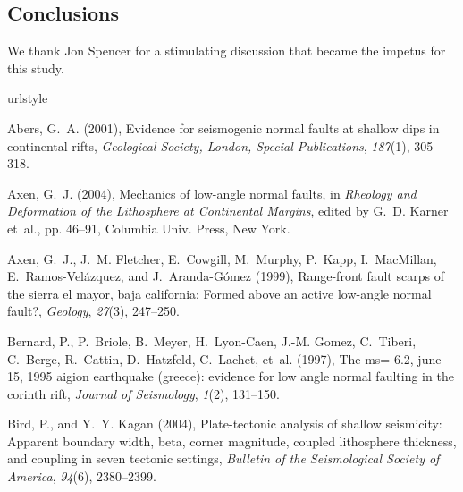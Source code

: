 \documentclass[twocolumn,grl]{AGUTeX}
\begin{document}
\begin{article}
\section{Conclusions}

\begin{acknowledgements}
  We thank Jon Spencer for a stimulating discussion that became the
  impetus for this study.
\end{acknowledgements}

\begin{thebibliography}{23}
\providecommand{\natexlab}[1]{#1}
\expandafter\ifx\csname urlstyle\endcsname\relax
  \providecommand{\doi}[1]{doi:\discretionary{}{}{}#1}\else
  \providecommand{\doi}{doi:\discretionary{}{}{}\begingroup
  \urlstyle{rm}\Url}\fi

Abers, G.~A. (2001), Evidence for seismogenic normal faults at shallow dips in
  continental rifts, \textit{Geological Society, London, Special Publications},
  \textit{187}(1), 305--318.

Axen, G.~J. (2004), Mechanics of low-angle normal faults, in \textit{Rheology
  and Deformation of the Lithosphere at Continental Margins}, edited by G.~D.
  Karner et~al., pp. 46--91, Columbia Univ. Press, New York.

Axen, G.~J., J.~M. Fletcher, E.~Cowgill, M.~Murphy, P.~Kapp, I.~MacMillan,
  E.~Ramos-Vel{\'a}zquez, and J.~Aranda-G{\'o}mez (1999), Range-front fault
  scarps of the sierra el mayor, baja california: Formed above an active
  low-angle normal fault?, \textit{Geology}, \textit{27}(3), 247--250.

Bernard, P., P.~Briole, B.~Meyer, H.~Lyon-Caen, J.-M. Gomez, C.~Tiberi,
  C.~Berge, R.~Cattin, D.~Hatzfeld, C.~Lachet, et~al. (1997), The ms= 6.2, june
  15, 1995 aigion earthquake (greece): evidence for low angle normal faulting
  in the corinth rift, \textit{Journal of Seismology}, \textit{1}(2), 131--150.

Bird, P., and Y.~Y. Kagan (2004), Plate-tectonic analysis of shallow
  seismicity: Apparent boundary width, beta, corner magnitude, coupled
  lithosphere thickness, and coupling in seven tectonic settings,
  \textit{Bulletin of the Seismological Society of America}, \textit{94}(6),
  2380--2399.


\end{thebibliography}
\end{article}
\end{document}
